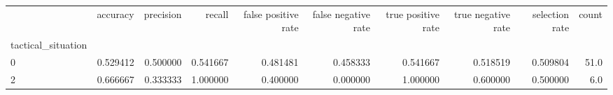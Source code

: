 \begin{tabular}{lrrrrrrrrr}
\toprule
{} &  accuracy &  precision &    recall &  false positive rate &  false negative rate &  true positive rate &  true negative rate &  selection rate &  count \\
tactical\_situation &           &            &           &                      &                      &                     &                     &                 &        \\
\midrule
0                  &  0.529412 &   0.500000 &  0.541667 &             0.481481 &             0.458333 &            0.541667 &            0.518519 &        0.509804 &   51.0 \\
2                  &  0.666667 &   0.333333 &  1.000000 &             0.400000 &             0.000000 &            1.000000 &            0.600000 &        0.500000 &    6.0 \\
\bottomrule
\end{tabular}
